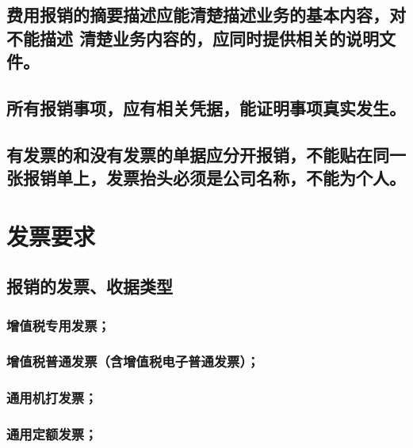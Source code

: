 \documentclass[16pt]{article}
\begin{document}
\subsection{费用报销的摘要描述应能清楚描述业务的基本内容，对不能描述
清楚业务内容的，应同时提供相关的说明文件。}
\subsection{所有报销事项，应有相关凭据，能证明事项真实发生。}
\subsection{有发票的和没有发票的单据应分开报销，不能贴在同一张报销单上，发票抬头必须是公司名称，不能为个人。}

\section{发票要求}
\subsection{报销的发票、收据类型}
\subsubsection{增值税专用发票；}
\subsubsection{增值税普通发票（含增值税电子普通发票）；}
\subsubsection{通用机打发票；}
\subsubsection{通用定额发票；}
\end{document}
